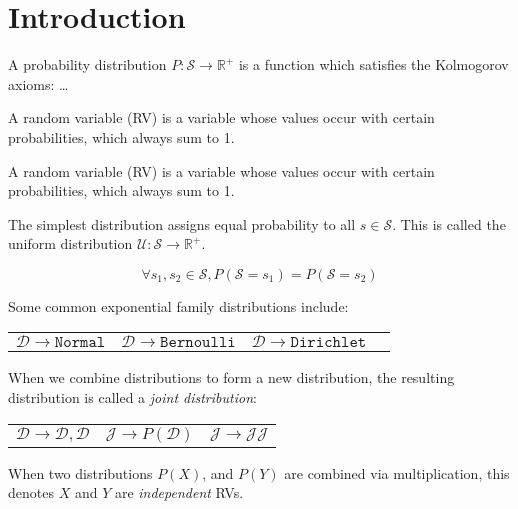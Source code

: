 \documentclass{article}
\begin{document}
\section{Introduction}\label{sec:intro}

A probability distribution $P: \mathcal S \rightarrow \mathbb R^+$ is a function which satisfies the Kolmogorov axioms: \ldots

A random variable (RV) is a variable whose values occur with certain probabilities, which always sum to 1.

A random variable (RV) is a variable whose values occur with certain probabilities, which always sum to 1.


The simplest distribution assigns equal probability to all $s \in \mathcal S$. This is called the uniform distribution $\mathcal{U}: \mathcal{S} \rightarrow \mathbb{R}^+$.

$$
\forall s_1, s_2 \in \mathcal S, P(\mathcal{S} = s_1) = P(\mathcal{S} = s_2)
$$

Some common exponential family distributions include:

\begin{tabular}{cccc}
    $\mathcal{D} \rightarrow \mathtt{Normal}$ &
    $\mathcal{D} \rightarrow \mathtt{Bernoulli}$ &
    $\mathcal{D} \rightarrow \mathtt{Dirichlet}$ &
\end{tabular}

%

When we combine distributions to form a new distribution, the resulting distribution is called a \textit{joint distribution}:

\begin{center}
\begin{tabular}{ccc}
    $\mathcal{D} \rightarrow \mathcal{D}, \mathcal{D}$ &$\mathcal{J} \rightarrow P(\mathcal{D})$ &$\mathcal{J} \rightarrow \mathcal{J}\mathcal{J}$
\end{tabular}
\end{center}

When two distributions $P(X)$, and $P(Y)$ are combined via multiplication, this denotes $X$ and $Y$ are \textit{independent} RVs.

\begin{prooftree}
\end{prooftree}
\end{document}
